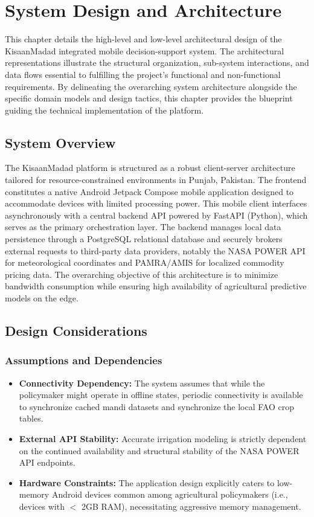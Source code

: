 \chapter{System Design and Architecture}

This chapter details the high-level and low-level architectural design of the KisaanMadad integrated mobile decision-support system. The architectural representations illustrate the structural organization, sub-system interactions, and data flows essential to fulfilling the project's functional and non-functional requirements. By delineating the overarching system architecture alongside the specific domain models and design tactics, this chapter provides the blueprint guiding the technical implementation of the platform.

\section{System Overview}
The KisaanMadad platform is structured as a robust client-server architecture tailored for resource-constrained environments in Punjab, Pakistan. The frontend constitutes a native Android Jetpack Compose mobile application designed to accommodate devices with limited processing power. This mobile client interfaces asynchronously with a central backend API powered by FastAPI (Python), which serves as the primary orchestration layer. The backend manages local data persistence through a PostgreSQL relational database and securely brokers external requests to third-party data providers, notably the NASA POWER API for meteorological coordinates and PAMRA/AMIS for localized commodity pricing data. The overarching objective of this architecture is to minimize bandwidth consumption while ensuring high availability of agricultural predictive models on the edge.

\section{Design Considerations}

\subsection{Assumptions and Dependencies}
\begin{itemize}
    \item \textbf{Connectivity Dependency:} The system assumes that while the policymaker might operate in offline states, periodic connectivity is available to synchronize cached mandi datasets and synchronize the local FAO crop tables.
    \item \textbf{External API Stability:} Accurate irrigation modeling is strictly dependent on the continued availability and structural stability of the NASA POWER API endpoints.
    \item \textbf{Hardware Constraints:} The application design explicitly caters to low-memory Android devices common among agricultural policymakers (i.e., devices with $<$ 2GB RAM), necessitating aggressive memory management.
\end{itemize}

